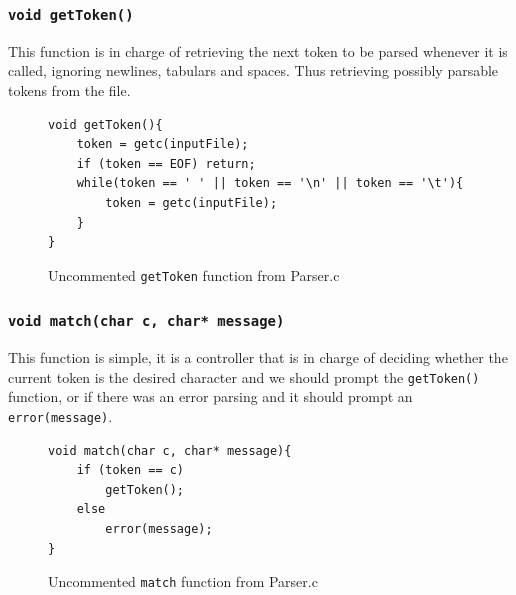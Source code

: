 \documentclass{article}
\begin{document}
\subsubsection{\texttt{void getToken()}}
This function is in charge of retrieving the next token to be parsed whenever it is called, ignoring newlines, tabulars and spaces. Thus retrieving possibly parsable tokens from the file.
\begin{figure}[H]
    \begin{lstlisting}
void getToken(){
    token = getc(inputFile);
    if (token == EOF) return; 
    while(token == ' ' || token == '\n' || token == '\t'){
        token = getc(inputFile);
    }
}
    \end{lstlisting}
    \caption{Uncommented \texttt{getToken} function from Parser.c}
\end{figure}
\subsubsection{\texttt{void match(char c, char* message)}} 
This function is simple, it is a controller that is in charge of deciding whether the current token is the desired character and we should prompt the \texttt{getToken()} function, or if there was an error parsing and it should prompt an \texttt{error(message)}.
\begin{figure}[H]
    \begin{lstlisting}
void match(char c, char* message){
    if (token == c) 
        getToken();
    else 
        error(message);
}
    \end{lstlisting}
    \caption{Uncommented \texttt{match} function from Parser.c}
\end{figure}
\end{document}
